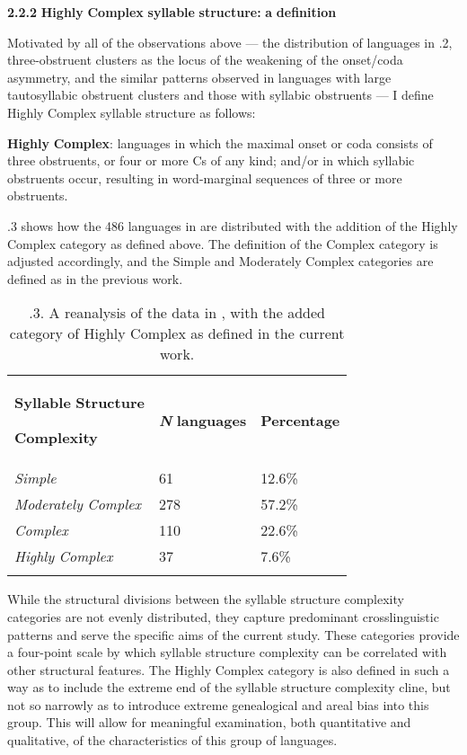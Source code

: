 \textbf{2.2.2} \textbf{Highly} \textbf{Complex} \textbf{syllable} \textbf{structure:} \textbf{a} \textbf{definition}



  Motivated by all of the observations above — the distribution of languages in .2, three-obstruent clusters as the locus of the weakening of the onset/coda asymmetry, and the similar patterns observed in languages with large tautosyllabic obstruent clusters and those with syllabic obstruents — I define Highly Complex syllable structure as follows:



\textbf{Highly} \textbf{Complex}: languages in which the maximal onset or coda consists of three obstruents, or four or more Cs of any kind; and/or in which syllabic obstruents occur, resulting in word-marginal sequences of three or more obstruents.



  .3 shows how the 486 languages in \citet{Maddieson2013a} are distributed with the addition of the Highly Complex category as defined above. The definition of the Complex category is adjusted accordingly, and the Simple and Moderately Complex categories are defined as in the previous work.






\begin{table}
\begin{tabularx}{\textwidth}{XXX}
\lsptoprule

\textbf{Syllable} \textbf{Structure} 

\textbf{Complexity} & \textbf{\textit{N}} \textbf{languages} & \textbf{Percentage}\\
\textit{Simple} & 61 & 12.6\%\\
\textit{Moderately} \textit{Complex} & 278 & 57.2\%\\
\textit{Complex} & 110 & 22.6\%\\
\textit{Highly} \textit{Complex} & 37 & 7.6\%\\
\lspbottomrule
\end{tabularx}
\caption{\label{tab:key:2}.3. A reanalysis of the data in \citet{Maddieson2013a}, with the added category of Highly Complex as defined in the current work.}
\end{table}




  While the structural divisions between the syllable structure complexity categories are not evenly distributed, they capture predominant crosslinguistic patterns and serve the specific aims of the current study. These categories provide a four-point scale by which syllable structure complexity can be correlated with other structural features. The Highly Complex category is also defined in such a way as to include the extreme end of the syllable structure complexity cline, but not so narrowly as to introduce extreme genealogical and areal bias into this group. This will allow for meaningful examination, both quantitative and qualitative, of the characteristics of this group of languages.


